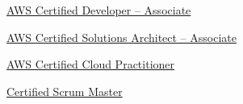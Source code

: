   

\vspace{-1em}
\begin{cventries}
    
    \cventry
    {\href{https://www.youracclaim.com/badges/8e27e6b2-0169-44f6-ae24-00edf35196af/linked_in_profile}{AWS Certified Developer – Associate}}
    {}
    {}
    {}
    {}

\vspace{-1.5em}

    \cventry
    {\href{https://www.youracclaim.com/badges/b27766c6-9978-4466-b2d1-dd42d8a6c966/linked_in_profile}{AWS Certified Solutions Architect – Associate}}
    {}
    {}
    {}
    {}

\vspace{-1.5em}

    \cventry
    {\href{https://www.youracclaim.com/badges/11a0ad01-7c8d-483a-92c0-35c413c64705/linked_in_profile}{AWS Certified Cloud Practitioner}}
    {}
    {}
    {}
    {}

\vspace{-1.5em}

    \cventry
    { \href{http://bcert.me/sbyomnubk}{Certified Scrum Master} }
    {}
    {}
    {}
    {}
    
    
    

\end{cventries}


